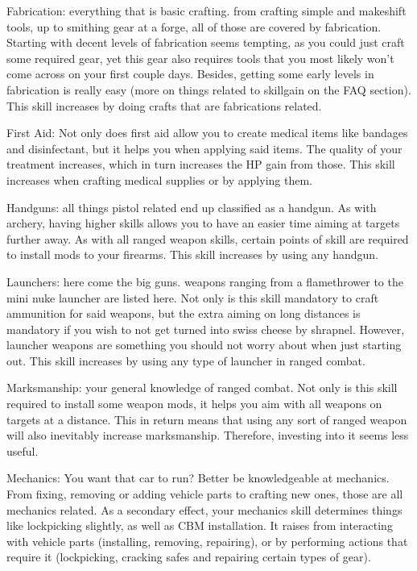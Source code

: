 \documentclass[11pt]{report}
\begin{document}
Fabrication: everything that is basic crafting. from crafting simple and makeshift tools, up to smithing gear at a forge, all of those are covered by fabrication. Starting with decent levels of fabrication seems tempting, as you could just craft some required gear, yet this gear also requires tools that you most likely won't come across on your first couple days. Besides, getting some early levels in fabrication is really easy (more on things related to skillgain on the FAQ section). This skill increases by doing crafts that are fabrications related.

First Aid: Not only does first aid allow you to create medical items like bandages and disinfectant, but it helps you when applying said items. The quality of your treatment increases, which in turn increases the HP gain from those. This skill increases when crafting medical supplies or by applying them.

Handguns: all things pistol related end up classified as a handgun. As with archery, having higher skills allows you to have an easier time aiming at targets further away. As with all ranged weapon skills, certain points of skill are required to install mods to your firearms. This skill increases by using any handgun.

Launchers: here come the big guns. weapons ranging from a flamethrower to the mini nuke launcher are listed here. Not only is this skill mandatory to craft ammunition for said weapons, but the extra aiming on long distances is mandatory if you wish to not get turned into swiss cheese by shrapnel. However, launcher weapons are something you should not worry about when just starting out. This skill increases by using any type of launcher in ranged combat.

Marksmanship: your general knowledge of ranged combat. Not only is this skill required to install some weapon mods, it helps you aim with all weapons on targets at a distance. This in return means that using any sort of ranged weapon will also inevitably increase marksmanship. Therefore, investing into it seems less useful.

Mechanics: You want that car to run? Better be knowledgeable at mechanics. From fixing, removing or adding vehicle parts to crafting new ones, those are all mechanics related. As a secondary effect, your mechanics skill determines things like lockpicking slightly, as well as CBM installation. It raises from interacting with vehicle parts (installing, removing, repairing), or by performing actions that require it (lockpicking, cracking safes and repairing certain types of gear).
\end{document}

